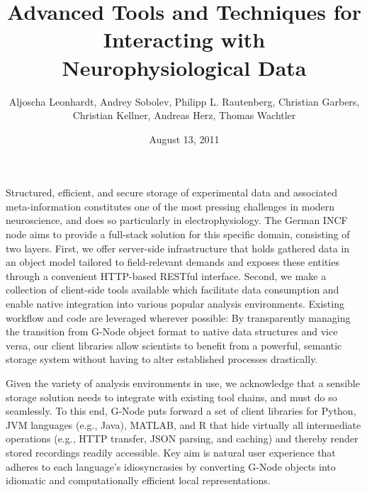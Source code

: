 \documentclass[a4paper]{article}
\begin{document}
\title{Advanced Tools and Techniques for Interacting with Neurophysiological Data}

\author{

  Aljoscha Leonhardt,
  Andrey Sobolev,
  Philipp L. Rautenberg,
  Christian Garbers,
  Christian Kellner,
  Andreas Herz,
  Thomas Wachtler

}
\date{August 13, 2011}

\maketitle


Structured, efficient, and secure storage of experimental data and
associated meta-information constitutes one of the most pressing
challenges in modern neuroscience, and does so particularly in
electrophysiology. The German INCF node aims to provide a full-stack
solution for this specific domain, consisting of two layers. First, we
offer server-side infrastructure that holds gathered data in an object
model tailored to field-relevant demands and exposes these entities
through a convenient HTTP-based RESTful interface. Second, we make a
collection of client-side tools available which facilitate data
consumption and enable native integration into various popular
analysis environments. Existing workflow and code are leveraged
wherever possible: By transparently managing the transition from
G-Node object format to native data structures and vice versa, our
client libraries allow scientists to benefit from a powerful, semantic
storage system without having to alter established processes
drastically.

Given the variety of analysis environments in use, we acknowledge that
a sensible storage solution needs to integrate with existing tool
chains, and must do so seamlessly. To this end, G-Node puts forward a
set of client libraries for Python, JVM languages (e.g., Java),
MATLAB, and R that hide virtually all intermediate operations (e.g.,
HTTP transfer, JSON parsing, and caching) and thereby render stored
recordings readily accessible. Key aim is natural user experience that
adheres to each language's idiosyncrasies by converting G-Node objects
into idiomatic and computationally efficient local representations.
\end{document}
